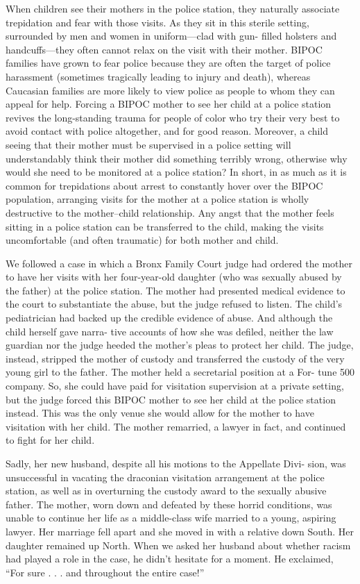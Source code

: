 When children see their mothers in the police station, they naturally
associate trepidation and fear with those visits. As they sit in this sterile
setting, surrounded by men and women in uniform—clad with gun-
filled holsters and handcuffs—they often cannot relax on the visit with
their mother. BIPOC families have grown to fear police because they
are often the target of police harassment (sometimes tragically leading
to injury and death), whereas Caucasian families are more likely to view
police as people to whom they can appeal for help. Forcing a BIPOC
mother to see her child at a police station revives the long-standing
trauma for people of color who try their very best to avoid contact with
police altogether, and for good reason. Moreover, a child seeing that
their mother must be supervised in a police setting will understandably
think their mother did something terribly wrong, otherwise why would
she need to be monitored at a police station? In short, in as much as
it is common for trepidations about arrest to constantly hover over the
BIPOC population, arranging visits for the mother at a police station is
wholly destructive to the mother–child relationship. Any angst that the
mother feels sitting in a police station can be transferred to the child,
making the visits uncomfortable (and often traumatic) for both mother
and child. \pfl{}


We followed a case in which a Bronx Family Court judge had ordered
the mother to have her visits with her four-year-old daughter (who was
sexually abused by the father) at the police station. The mother had
presented medical evidence to the court to substantiate the abuse, but
the judge refused to listen. The child’s pediatrician had backed up the
credible evidence of abuse. And although the child herself gave narra-
tive accounts of how she was defiled, neither the law guardian nor the
judge heeded the mother’s pleas to protect her child. The judge, instead,
stripped the mother of custody and transferred the custody of the very
young girl to the father. The mother held a secretarial position at a For-
tune 500 company. So, she could have paid for visitation supervision at a
private setting, but the judge forced this BIPOC mother to see her child
at the police station instead. This was the only venue she would allow
for the mother to have visitation with her child. The mother remarried,
a lawyer in fact, and continued to fight for her child. \pfl{}


Sadly, her new husband, despite all his motions to the Appellate Divi-
sion, was unsuccessful in vacating the draconian visitation arrangement
at the police station, as well as in overturning the custody award to the
sexually abusive father. The mother, worn down and defeated by these
horrid conditions, was unable to continue her life as a middle-class wife
married to a young, aspiring lawyer. Her marriage fell apart and she
moved in with a relative down South. Her daughter remained up North.
When we asked her husband about whether racism had played a role in
the case, he didn’t hesitate for a moment. He exclaimed, “For sure . . .
and throughout the entire case!” \pfl{}


